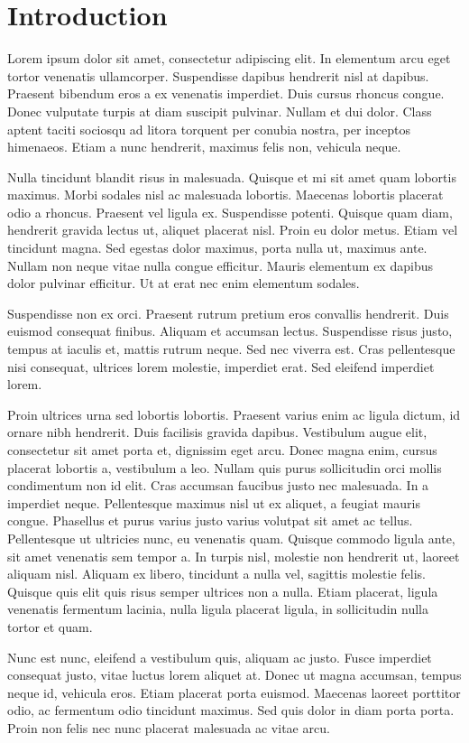 \chapter{Introduction}\label{chap:introduction}

Lorem ipsum dolor sit amet, consectetur adipiscing elit. In elementum arcu eget
tortor venenatis ullamcorper. Suspendisse dapibus hendrerit nisl at dapibus.
Praesent bibendum eros a ex venenatis imperdiet. Duis cursus rhoncus congue.
Donec vulputate turpis at diam suscipit pulvinar. Nullam et dui dolor. Class
aptent taciti sociosqu ad litora torquent per conubia nostra, per inceptos
himenaeos. Etiam a nunc hendrerit, maximus felis non, vehicula neque.

Nulla tincidunt blandit risus in malesuada. Quisque et mi sit amet quam lobortis
maximus. Morbi sodales nisl ac malesuada lobortis. Maecenas lobortis placerat
odio a rhoncus. Praesent vel ligula ex. Suspendisse potenti. Quisque quam diam,
hendrerit gravida lectus ut, aliquet placerat nisl. Proin eu dolor metus. Etiam
vel tincidunt magna. Sed egestas dolor maximus, porta nulla ut, maximus ante.
Nullam non neque vitae nulla congue efficitur. Mauris elementum ex dapibus dolor
pulvinar efficitur. Ut at erat nec enim elementum sodales.

Suspendisse non ex orci. Praesent rutrum pretium eros convallis hendrerit. Duis
euismod consequat finibus. Aliquam et accumsan lectus. Suspendisse risus justo,
tempus at iaculis et, mattis rutrum neque. Sed nec viverra est. Cras
pellentesque nisi consequat, ultrices lorem molestie, imperdiet erat. Sed
eleifend imperdiet lorem.

Proin ultrices urna sed lobortis lobortis. Praesent varius enim ac ligula
dictum, id ornare nibh hendrerit. Duis facilisis gravida dapibus. Vestibulum
augue elit, consectetur sit amet porta et, dignissim eget arcu. Donec magna
enim, cursus placerat lobortis a, vestibulum a leo. Nullam quis purus
sollicitudin orci mollis condimentum non id elit. Cras accumsan faucibus justo
nec malesuada. In a imperdiet neque. Pellentesque maximus nisl ut ex aliquet, a
feugiat mauris congue. Phasellus et purus varius justo varius volutpat sit amet
ac tellus. Pellentesque ut ultricies nunc, eu venenatis quam. Quisque commodo
ligula ante, sit amet venenatis sem tempor a. In turpis nisl, molestie non
hendrerit ut, laoreet aliquam nisl. Aliquam ex libero, tincidunt a nulla vel,
sagittis molestie felis. Quisque quis elit quis risus semper ultrices non a
nulla. Etiam placerat, ligula venenatis fermentum lacinia, nulla ligula placerat
ligula, in sollicitudin nulla tortor et quam.

Nunc est nunc, eleifend a vestibulum quis, aliquam ac justo. Fusce imperdiet
consequat justo, vitae luctus lorem aliquet at. Donec ut magna accumsan, tempus
neque id, vehicula eros. Etiam placerat porta euismod. Maecenas laoreet
porttitor odio, ac fermentum odio tincidunt maximus. Sed quis dolor in diam
porta porta. Proin non felis nec nunc placerat malesuada ac vitae arcu.

\newpage
